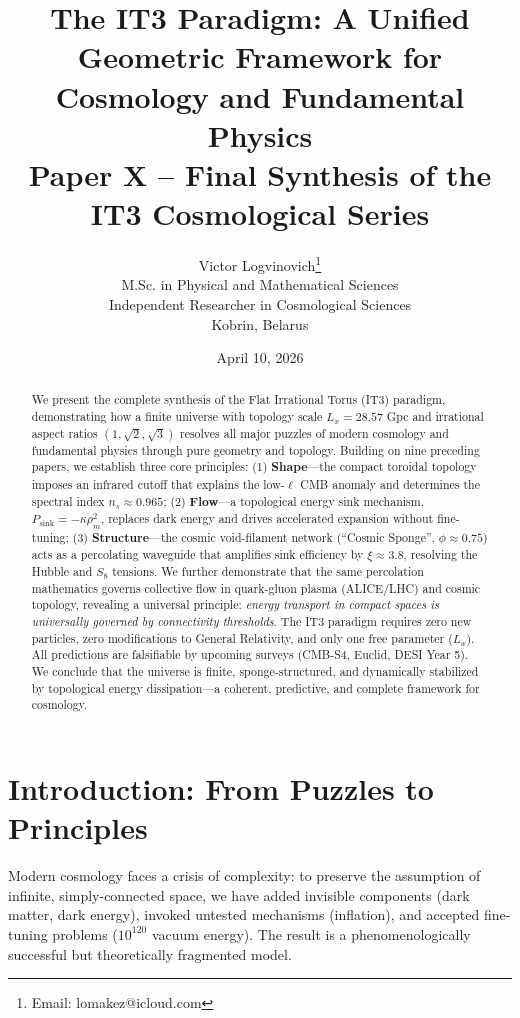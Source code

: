 \documentclass[12pt,a4paper]{article}
\title{\textbf{The IT3 Paradigm: A Unified Geometric Framework for Cosmology and Fundamental Physics}\\[0.5cm]
\large Paper X -- Final Synthesis of the IT3 Cosmological Series}
\author{Victor Logvinovich\thanks{Email: lomakez@icloud.com}\\
M.Sc. in Physical and Mathematical Sciences\\
Independent Researcher in Cosmological Sciences\\
Kobrin, Belarus}
\date{April 10, 2026}
\begin{document}
\maketitle

\begin{abstract}
We present the complete synthesis of the Flat Irrational Torus (IT3) paradigm, demonstrating how a finite universe with topology scale $L_x = 28.57$ Gpc and irrational aspect ratios $(1, \sqrt{2}, \sqrt{3})$ resolves all major puzzles of modern cosmology and fundamental physics through pure geometry and topology. Building on nine preceding papers, we establish three core principles: (1) \textbf{Shape}---the compact toroidal topology imposes an infrared cutoff that explains the low-$\ell$ CMB anomaly and determines the spectral index $n_s \approx 0.965$; (2) \textbf{Flow}---a topological energy sink mechanism, $P_{\mathrm{sink}} = -\kappa \rho_m^2$, replaces dark energy and drives accelerated expansion without fine-tuning; (3) \textbf{Structure}---the cosmic void-filament network (``Cosmic Sponge'', $\phi \approx 0.75$) acts as a percolating waveguide that amplifies sink efficiency by $\xi \approx 3.8$, resolving the Hubble and $S_8$ tensions. We further demonstrate that the same percolation mathematics governs collective flow in quark-gluon plasma (ALICE/LHC) and cosmic topology, revealing a universal principle: \textit{energy transport in compact spaces is universally governed by connectivity thresholds}. The IT3 paradigm requires zero new particles, zero modifications to General Relativity, and only one free parameter ($L_x$). All predictions are falsifiable by upcoming surveys (CMB-S4, Euclid, DESI Year 5). We conclude that the universe is finite, sponge-structured, and dynamically stabilized by topological energy dissipation---a coherent, predictive, and complete framework for cosmology.
\end{abstract}

\section{Introduction: From Puzzles to Principles}

Modern cosmology faces a crisis of complexity: to preserve the assumption of infinite, simply-connected space, we have added invisible components (dark matter, dark energy), invoked untested mechanisms (inflation), and accepted fine-tuning problems ($10^{120}$ vacuum energy). The result is a phenomenologically successful but theoretically fragmented model.
\end{document}
